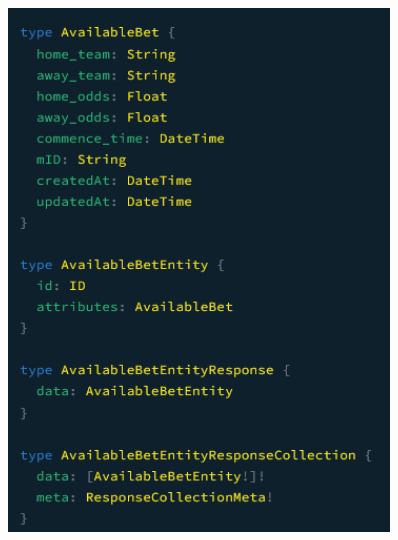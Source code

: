 \documentclass[singlecolumn]{article}
\begin{document}
\begin{figure}[H]
    \centering
    \begin{minipage}[c]{0.25\textwidth}
    \centering
    \includegraphics[width=0.9\textwidth]{graphqlschema1.png}
    \end{minipage}%
    \begin{minipage}[c]{0.25\textwidth}
    \centering

\end{minipage}
\end{figure}
\end{document}
